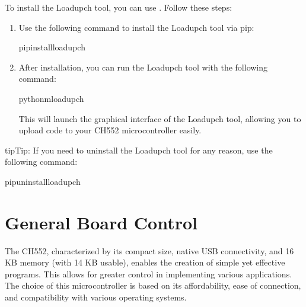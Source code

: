 \documentclass[letterpaper,10pt,english]{sphinxmanual}
\begin{document}
\sphinxAtStartPar
To install the Loadupch tool, you can use . Follow these steps:
\begin{enumerate}
%
\item {} 
\sphinxAtStartPar
{}

\sphinxAtStartPar
Use the following command to install the Loadupch tool via pip:

\begin{sphinxVerbatim}[commandchars=\\\{\}]
pipinstallloadupch
\end{sphinxVerbatim}

\item {} 
\sphinxAtStartPar
{}

\sphinxAtStartPar
After installation, you can run the Loadupch tool with the following command:

\begin{sphinxVerbatim}[commandchars=\\\{\}]
python\PYGZhy{}mloadupch
\end{sphinxVerbatim}

\sphinxAtStartPar
This will launch the graphical interface of the Loadupch tool, allowing you to upload code to your CH552 microcontroller easily.

\end{enumerate}

\begin{sphinxadmonition}{tip}{Tip:}
\sphinxAtStartPar
If you need to uninstall the Loadupch tool for any reason, use the following command:

\begin{sphinxVerbatim}[commandchars=\\\{\}]
pipuninstallloadupch
\end{sphinxVerbatim}
\end{sphinxadmonition}

\sphinxstepscope


\chapter{General Board Control}
\label{\detokenize{generalboardcontrol:general-board-control}}\label{\detokenize{generalboardcontrol::doc}}
\sphinxAtStartPar
The CH552, characterized by its compact size, native USB connectivity, and 16 KB memory (with 14 KB usable), enables the creation of simple yet effective programs. This allows for greater control in implementing various applications. The choice of this microcontroller is based on its affordability, ease of connection, and compatibility with various operating systems.
\end{document}
